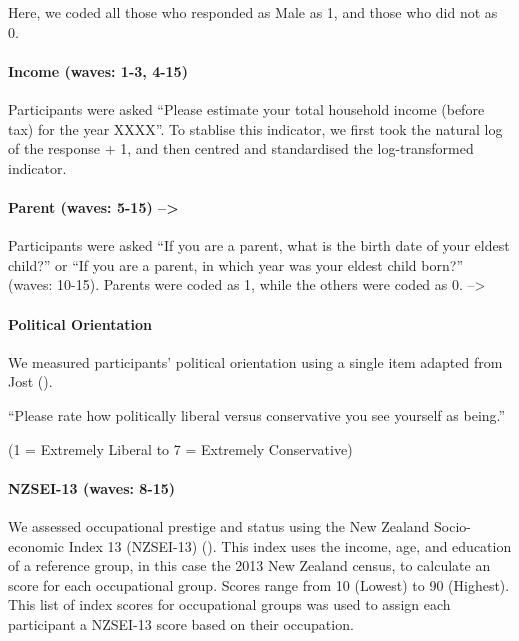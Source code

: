 \documentclass[
  singlecolumn]{article}
\let\oldparagraph\paragraph
\renewcommand{\paragraph}[1]{\oldparagraph{#1}\mbox{}}
\begin{document}
Here, we coded all those who responded as Male as 1, and those who did
not as 0.

\paragraph{Income (waves: 1-3, 4-15)}\label{income-waves-1-3-4-15}

Participants were asked ``Please estimate your total household income
(before tax) for the year XXXX''. To stablise this indicator, we first
took the natural log of the response + 1, and then centred and
standardised the log-transformed indicator.

\paragraph{Parent (waves: 5-15)
--\textgreater{}}\label{parent-waves-5-15}

Participants were asked ``If you are a parent, what is the birth date of
your eldest child?'' or ``If you are a parent, in which year was your
eldest child born?'' (waves: 10-15). Parents were coded as 1, while the
others were coded as 0. --\textgreater{}

\paragraph{Political Orientation}\label{political-orientation}

We measured participants' political orientation using a single item
adapted from Jost ().

``Please rate how politically liberal versus conservative you see
yourself as being.''

(1 = Extremely Liberal to 7 = Extremely Conservative)

\paragraph{NZSEI-13 (waves: 8-15)}\label{nzsei-13-waves-8-15}

We assessed occupational prestige and status using the New Zealand
Socio-economic Index 13 (NZSEI-13) (). This index uses the income, age, and education of
a reference group, in this case the 2013 New Zealand census, to
calculate an score for each occupational group. Scores range from 10
(Lowest) to 90 (Highest). This list of index scores for occupational
groups was used to assign each participant a NZSEI-13 score based on
their occupation.
\end{document}
